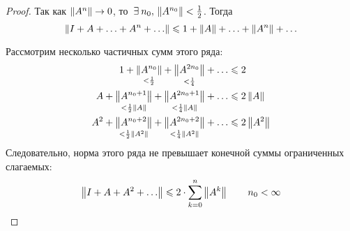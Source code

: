 \documentclass[12pt]{article}
\begin{document}
\begin{proof}
			Так как $\left\| A^n \right\| \rightarrow 0$, то $\exists n_0,\,\norm{A^{n_0}} < \frac{1}{2}$. Тогда
			$$\left\| I + A + \ldots + A^n + \ldots \right\| \leqslant 1 + \left\| A \right\| + \ldots + \left\| A^n \right\| + \ldots$$
		
			Рассмотрим несколько частичных сумм этого ряда:
			\begin{align*}
				1 + \underset{< \frac{1}{2}}{\left\| A^{n_0} \right\|} + \underset{< \frac{1}{4}}{\left\| A^{2n_0} \right\|} + \ldots &\leqslant 2 \\
				A + \underset{< \frac{1}{2}\left\| A \right\|}{\left\| A^{n_0+1} \right\|} 
				+ \underset{< \frac{1}{4}\left\| A \right\|}{\left\| A^{2n_0+1} \right\|} + \ldots &\leqslant 2 \left\| A \right\| \\
				A^2 + \underset{< \frac{1}{2}\left\| A^2 \right\|}{\left\| A^{n_0+2} \right\|} 
				+ \underset{< \frac{1}{4}\left\| A^2 \right\|}{\left\| A^{2n_0+2} \right\|} + \ldots &\leqslant 2 \left\| A^2 \right\| \\
			\end{align*}
			Следовательно, норма этого ряда не превышает конечной суммы ограниченных слагаемых:
			$$\left\| I + A + A^2 + \ldots \right\| \leqslant 2\cdot\sum_{k=0}^n\left\| A^k \right\| \qquad n_0 < \infty$$
		\end{proof}
\end{document}
